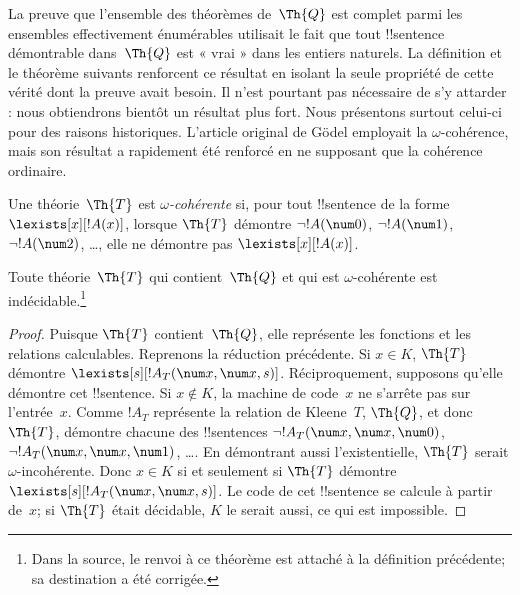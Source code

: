 \documentclass[../../../include/open-logic-section]{subfiles}
\begin{document}


\begin{explain}
La preuve que l'ensemble des théorèmes de~$\Th{Q}$ est
complet parmi les ensembles effectivement énumérables
utilisait le fait que tout !!{sentence} démontrable
dans~$\Th{Q}$ est « vrai » dans les entiers naturels.
La définition et le théorème suivants renforcent ce
résultat en isolant la seule propriété de cette vérité
dont la preuve avait besoin. Il n'est pourtant pas
nécessaire de s'y attarder : nous obtiendrons bientôt
un résultat plus fort. Nous présentons surtout celui-ci
pour des raisons historiques. L'article original de
Gödel employait la $\omega$-cohérence, mais son résultat
a rapidement été renforcé en ne supposant que la
cohérence ordinaire.
\end{explain}

\begin{defn}

Une théorie~$\Th{T}$ est \emph{$\omega$-cohérente} si,
pour tout !!{sentence} de la forme
$\lexists[x][!A(x)]$, lorsque $\Th{T}$ démontre
$\lnot !A(\num 0)$, $\lnot !A(\num 1)$,
$\lnot !A(\num 2)$, \dots, elle ne démontre pas
$\lexists[x][!A(x)]$.
\end{defn}

\begin{thm}
Toute théorie~$\Th{T}$ qui contient~$\Th{Q}$ et qui
est $\omega$-cohérente est indécidable.\footnote{Dans la source, le renvoi à ce théorème est attaché à la définition précédente; sa destination a été corrigée.}
\end{thm}

\begin{proof}
Puisque $\Th{T}$ contient~$\Th{Q}$, elle représente
les fonctions et les relations calculables.
Reprenons la réduction précédente. Si $x\in K$,
$\Th{T}$ démontre
$\lexists[s][!A_T(\num x,\num x,s)]$.
Réciproquement, supposons qu'elle démontre cet
!!{sentence}. Si $x\notin K$, la machine de code~$x$
ne s'arrête pas sur l'entrée~$x$. Comme $!A_T$
représente la relation de Kleene~$T$,
$\Th{Q}$, et donc $\Th{T}$, démontre chacune
des !!{sentence}s
$\lnot !A_T(\num x,\num x,\num 0)$,
$\lnot !A_T(\num x,\num x,\num 1)$, \dots.
En démontrant aussi l'existentielle, $\Th{T}$
serait $\omega$-incohérente. Donc $x\in K$
si et seulement si $\Th{T}$ démontre
$\lexists[s][!A_T(\num x,\num x,s)]$.
Le code de cet !!{sentence} se calcule à partir
de~$x$; si $\Th{T}$ était décidable, $K$ le
serait aussi, ce qui est impossible.
\end{proof}
\end{document}
